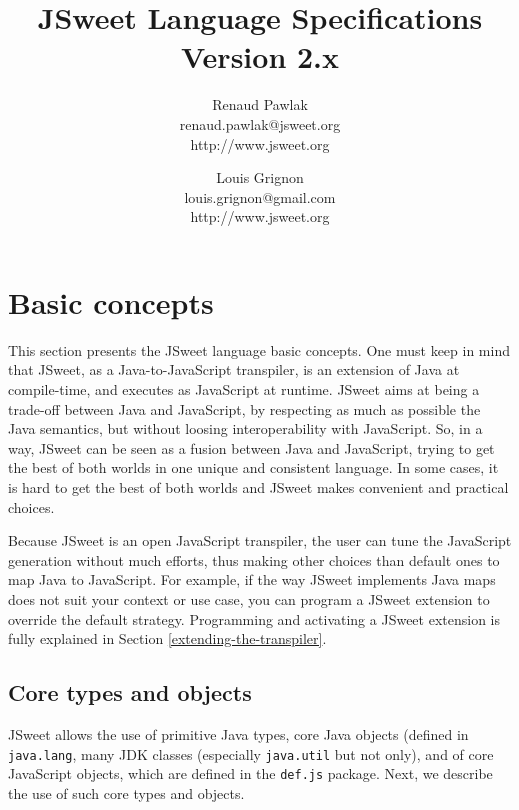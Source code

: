 \documentclass[a4paper]{report}
\begin{document}
\title{JSweet Language Specifications\\{\large Version 2.x}}
\author{%
Renaud Pawlak\\
{\normalsize renaud.pawlak@jsweet.org}\\
{\normalsize http://www.jsweet.org}\\
}%
\author{%
Louis Grignon\\
{\normalsize louis.grignon@gmail.com}\\
{\normalsize http://www.jsweet.org}\\
}%
\date{}
\maketitle

\tableofcontents

\chapter{Basic concepts} 

This section presents the JSweet language basic concepts. One must keep in mind that JSweet, as a Java-to-JavaScript transpiler, is an extension of Java at compile-time, and executes as JavaScript at runtime. JSweet aims at being a trade-off between Java and JavaScript, by respecting as much as possible the Java semantics, but without loosing interoperability with JavaScript. So, in a way, JSweet can be seen as a fusion between Java and JavaScript, trying to get the best of both worlds in one unique and consistent language. In some cases, it is hard to get the best of both worlds and JSweet makes convenient and practical choices.

Because JSweet is an open JavaScript transpiler, the user can tune the JavaScript generation without much efforts, thus making other choices than default ones to map Java to JavaScript. For example, if the way JSweet implements Java maps does not suit your context or use case, you can program a JSweet extension to override the default strategy. Programming and activating a JSweet extension is fully explained in Section \ref{extending-the-transpiler}.

\section{Core types and objects}

JSweet allows the use of primitive Java types, core Java objects (defined in \texttt{java.lang}, many JDK classes (especially \texttt{java.util} but not only), and of core JavaScript objects, which are defined in the \texttt{def.js} package. Next, we describe the use of such core types and objects.
\end{document}
